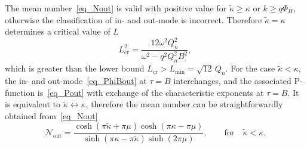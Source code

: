 \documentclass[aps,nofootinbib,superscriptaddress
]{revtex4}
\begin{document}
The mean number~\eqref{eq_Nout} is valid with positive value for $\tilde{\kappa} \ge \kappa$ or $k \ge q \Phi_H$, otherwise the classification of in- and out-mode is incorrect. Therefore $\tilde{\kappa} = \kappa$ determines a critical value of $L$
\begin{equation} \label{eq_Lcr}
L_\mathrm{cr}^2 = \frac{12 \omega^2 Q_n^2}{\omega^2 - q^2 Q_n^2 B^2},
\end{equation}
which is greater than the lower bound $L_\mathrm{cr} > L_\mathrm{min} = \sqrt{12} \, Q_n$. For the case $\tilde{\kappa} < \kappa$, the in- and out-mode~\eqref{eq_PhiBout} at $\tau = B$ interchanges, and the associated P-function is~\eqref{eq_Pout} with exchange of the characteristic exponents at $\tau = B$. It is equivalent to $\tilde{\kappa} \leftrightarrow \kappa$, therefore the mean number can be straightforwardly obtained from~\eqref{eq_Nout}
\begin{equation}
\mathcal{N}_\mathrm{out} = \frac{\cosh(\pi \tilde\kappa + \pi \mu) \cosh(\pi \kappa - \pi \mu)}{\sinh(\pi \kappa - \pi \tilde{\kappa}) \sinh(2 \pi \mu)}, \qquad \mathrm{for} \quad \tilde\kappa < \kappa.
\end{equation}
\end{document}
